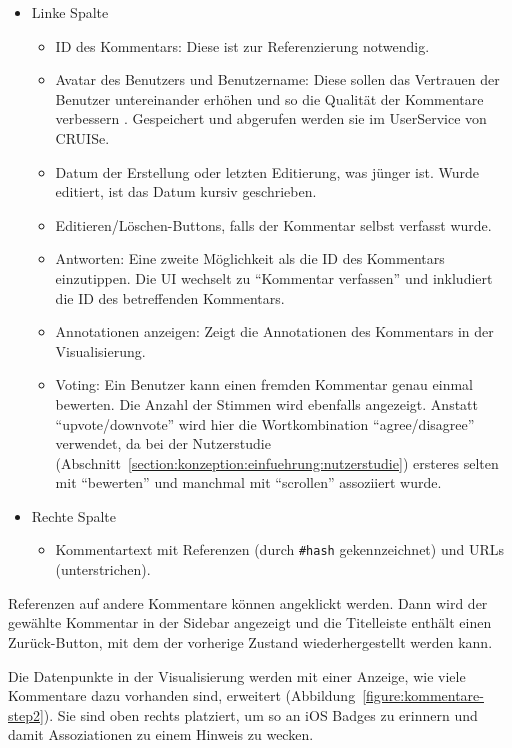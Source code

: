 \documentclass[
	headsepline,
	footsepline,
	fontsize=12pt,
	bibliography=totoc
]{scrbook}
\begin{document}
\begin{itemize}
	\item Linke Spalte
	\begin{itemize}
		\item ID des Kommentars: Diese ist zur Referenzierung notwendig.
		\item Avatar des Benutzers und Benutzername: Diese sollen das Vertrauen der Benutzer untereinander erhöhen und so die Qualität der Kommentare verbessern \cite{Chiu2006}. Gespeichert und abgerufen werden sie im UserService von CRUISe.
		\item Datum der Erstellung oder letzten Editierung, was jünger ist. Wurde editiert, ist das Datum kursiv geschrieben.
		\item Editieren/Löschen-Buttons, falls der Kommentar selbst verfasst wurde.
		\item Antworten: Eine zweite Möglichkeit als die ID des Kommentars einzutippen. Die UI wechselt zu \enquote{Kommentar verfassen} und inkludiert die ID des betreffenden Kommentars.
		\item Annotationen anzeigen: Zeigt die Annotationen des Kommentars in der Visualisierung.
		\item Voting: Ein Benutzer kann einen fremden Kommentar genau einmal bewerten. Die Anzahl der Stimmen wird ebenfalls angezeigt. Anstatt \enquote{upvote/downvote} wird hier die Wortkombination \enquote{agree/disagree} verwendet, da bei der Nutzerstudie (Abschnitt~\ref{section:konzeption:einfuehrung:nutzerstudie}) ersteres selten mit \enquote{bewerten} und manchmal mit \enquote{scrollen} assoziiert wurde.
	\end{itemize}
	\item Rechte Spalte
	\begin{itemize}
		\item Kommentartext mit Referenzen (durch \texttt{\#hash} gekennzeichnet) und URLs (unterstrichen).
	\end{itemize}
\end{itemize}

Referenzen auf andere Kommentare können angeklickt werden. Dann wird der gewählte Kommentar in der Sidebar angezeigt und die Titelleiste enthält einen Zurück-Button, mit dem der vorherige Zustand wiederhergestellt werden kann.

Die Datenpunkte in der Visualisierung werden mit einer Anzeige, wie viele Kommentare dazu vorhanden sind, erweitert (Abbildung~\ref{figure:kommentare-step2}). Sie sind oben rechts platziert, um so an iOS Badges zu erinnern und damit Assoziationen zu einem Hinweis zu wecken.
\end{document}
